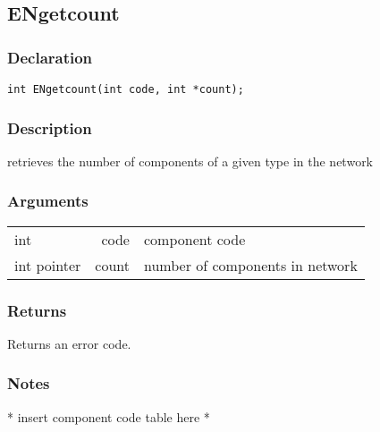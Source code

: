 \subsection{ENgetcount}
\subsubsection{Declaration}
\begin{lstlisting}
int ENgetcount(int code, int *count);
\end{lstlisting}
\subsubsection{Description}
retrieves the number of components of a given type in the network 
\subsubsection{Arguments}
\begin{tabular}{l r p{11cm} }
int&code&component code\\[6pt]
int pointer&count&number of components in network\\[6pt]
\end{tabular}
\subsubsection{Returns}
Returns an error code.
\subsubsection{Notes}
* insert component code table here *